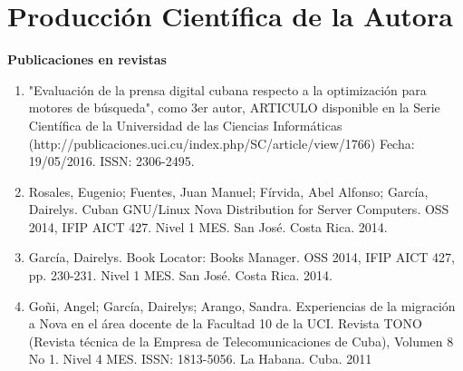 \clearpage
\pagestyle{fancy} %

\chapter*{Producci\'on Cient\'ifica de la Autora}

\textbf{\large{Publicaciones en revistas}}
\begin{enumerate}
	\item "Evaluación de la prensa digital cubana respecto a la optimización para motores de búsqueda", como 3er autor, ARTICULO disponible en la Serie Científica de la Universidad de las Ciencias Informáticas (http://publicaciones.uci.cu/index.php/SC/article/view/1766) Fecha: 19/05/2016. ISSN: 2306-2495.
	\item Rosales, Eugenio; Fuentes, Juan Manuel; Fírvida, Abel Alfonso; García, Dairelys. Cuban GNU/Linux Nova Distribution for Server Computers. OSS 2014, IFIP AICT 427. Nivel 1 MES. San José. Costa Rica. 2014. %
	\item García, Dairelys. Book Locator: Books Manager. OSS 2014, IFIP AICT 427, pp. 230-231. Nivel 1 MES. San José. Costa Rica. 2014. %
	\item Goñi, Angel; García, Dairelys; Arango, Sandra. Experiencias de la migración a Nova en el área docente de la Facultad 10 de la UCI. Revista TONO (Revista técnica de la Empresa de Telecomunicaciones de Cuba), Volumen 8 No 1. Nivel 4 MES. ISSN: 1813-5056. La Habana. Cuba. 2011
\end{enumerate}


